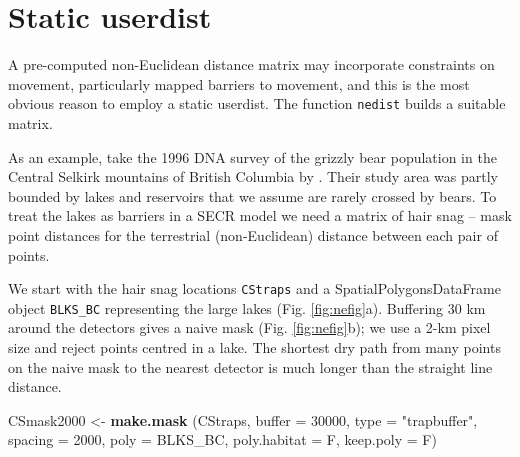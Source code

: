 \documentclass[
]{book}
\newenvironment{Shaded}{\begin{snugshade}}{\end{snugshade}}
\newcommand{\AttributeTok}[1]{\textcolor[rgb]{0.13,0.29,0.53}{#1}}
\newcommand{\DecValTok}[1]{\textcolor[rgb]{0.00,0.00,0.81}{#1}}
\newcommand{\FunctionTok}[1]{\textcolor[rgb]{0.13,0.29,0.53}{\textbf{#1}}}
\newcommand{\NormalTok}[1]{#1}
\newcommand{\OtherTok}[1]{\textcolor[rgb]{0.56,0.35,0.01}{#1}}
\newcommand{\StringTok}[1]{\textcolor[rgb]{0.31,0.60,0.02}{#1}}
\begin{document}
\section{Static userdist}\label{static-userdist}


A pre-computed non-Euclidean distance matrix may incorporate constraints on movement, particularly mapped barriers to movement, and this is the most obvious reason to employ a static userdist. The function \texttt{nedist} builds a suitable matrix.

As an example, take the 1996 DNA survey of the grizzly bear population in the Central Selkirk mountains of British Columbia by \citet{ms00}. Their study area was partly bounded by lakes and reservoirs that we assume are rarely crossed by bears. To treat the lakes as barriers in a SECR model we need a matrix of hair snag -- mask point distances for the terrestrial (non-Euclidean) distance between each pair of points.

We start with the hair snag locations \texttt{CStraps} and a SpatialPolygonsDataFrame object \texttt{BLKS\_BC} representing the large lakes (Fig. \ref{fig:nefig}a). Buffering 30 km around the detectors gives a naive mask (Fig. \ref{fig:nefig}b); we use a 2-km pixel size and reject points centred in a lake. The shortest dry path from many points on the naive mask to the nearest detector is much longer than the straight line distance.

\begin{Shaded}
\begin{Highlighting}[]
\NormalTok{CSmask2000 }\OtherTok{\textless{}{-}} \FunctionTok{make.mask}\NormalTok{ (CStraps, }\AttributeTok{buffer =} \DecValTok{30000}\NormalTok{, }\AttributeTok{type =} \StringTok{"trapbuffer"}\NormalTok{, }
      \AttributeTok{spacing =} \DecValTok{2000}\NormalTok{, }\AttributeTok{poly =}\NormalTok{ BLKS\_BC, }\AttributeTok{poly.habitat =}\NormalTok{ F, }\AttributeTok{keep.poly =}\NormalTok{ F)}
\end{Highlighting}
\end{Shaded}
\end{document}
